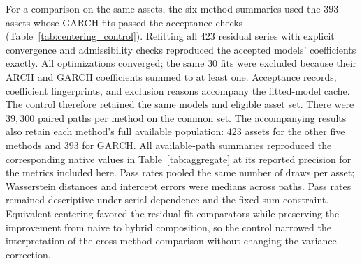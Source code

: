 For a comparison on the same assets, the six-method summaries used
the $393$ assets whose GARCH fits passed the acceptance checks
(Table~\ref{tab:centering_control}). Refitting all $423$ residual
series with explicit convergence and admissibility checks reproduced
the accepted models' coefficients exactly. All optimizations converged;
the same $30$ fits were excluded because their ARCH and GARCH
coefficients summed to at least one. Acceptance records, coefficient
fingerprints, and exclusion reasons accompany the fitted-model cache.
The control therefore retained the same models and eligible asset set. There were $39{,}300$
paired paths per method on the common set. The accompanying results
also retain each method's full available population: $423$ assets
for the other five methods and $393$ for GARCH. All available-path
summaries reproduced the corresponding native values in
Table~\ref{tab:aggregate} at its reported precision for the metrics
included here. Pass rates pooled the same number of draws per asset;
Wasserstein distances and intercept errors were medians across paths.
Pass rates remained descriptive under serial dependence and the
fixed-sum constraint. Equivalent centering favored the residual-fit
comparators while preserving the improvement from naive to hybrid
composition, so the control narrowed the interpretation of the
cross-method comparison without changing the variance correction.

\begin{table}[H]
  \centering
  \caption{\textbf{Paired control for residual centering on common
    training assets.} Native and centered results use the same
    $393$ assets and $100$ paths per asset. Centered paths have zero
    residual mean over $2{,}766$ observations. Kolmogorov--Smirnov (KS)
    and Anderson--Darling (AD) columns give non-rejection percentages
    at $\alpha=0.05$; higher values indicate closer empirical fit.
    $W_1$ is median Wasserstein-1 distance, and $|\hat\alpha-\alpha|$
    is median absolute ordinary least squares (OLS) intercept error, both in
    $\mathrm{yr}^{-1}$; lower values indicate closer agreement.
    Naive and hybrid already center each residual path.
    JumpHMM denotes the hidden Markov generator, with jumps disabled;
    SIM denotes the single-index model, and GARCH denotes generalized
    autoregressive conditional heteroskedasticity.}
  \label{tab:centering_control}
  \footnotesize
  \setlength{\tabcolsep}{3pt}
  
\end{table}


